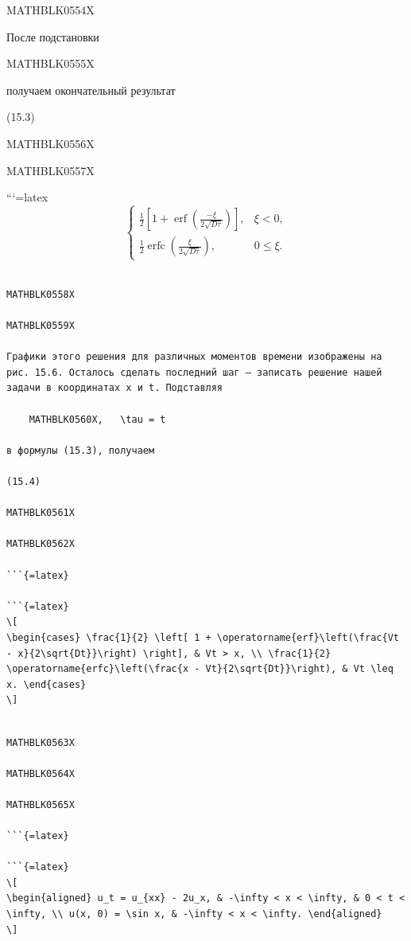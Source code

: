\documentclass[
]{article}
\begin{document}
MATHBLK0554X

После подстановки

MATHBLK0555X

получаем окончательный результат

(15.3)

MATHBLK0556X

MATHBLK0557X

```{=latex}
\[
\begin{cases} \frac{1}{2} \left[ 1 + \operatorname{erf} \left( \frac{-\xi}{2\sqrt{D\tau}} \right) \right], & \xi < 0, \\ \frac{1}{2} \operatorname{erfc} \left( \frac{\xi}{2\sqrt{D\tau}} \right), & 0 \leq \xi. \end{cases}
\]

\begin{verbatim}

MATHBLK0558X

MATHBLK0559X

Графики этого решения для различных моментов времени изображены на рис. 15.6. Осталось сделать последний шаг — записать решение нашей задачи в координатах x и t. Подставляя

    MATHBLK0560X,   \tau = t

в формулы (15.3), получаем

(15.4)

MATHBLK0561X

MATHBLK0562X

```{=latex}

```{=latex}
\[
\begin{cases} \frac{1}{2} \left[ 1 + \operatorname{erf}\left(\frac{Vt - x}{2\sqrt{Dt}}\right) \right], & Vt > x, \\ \frac{1}{2} \operatorname{erfc}\left(\frac{x - Vt}{2\sqrt{Dt}}\right), & Vt \leq x. \end{cases}
\]
\end{verbatim}

\begin{verbatim}

MATHBLK0563X

MATHBLK0564X

MATHBLK0565X

```{=latex}

```{=latex}
\[
\begin{aligned} u_t = u_{xx} - 2u_x, & -\infty < x < \infty, & 0 < t < \infty, \\ u(x, 0) = \sin x, & -\infty < x < \infty. \end{aligned}
\]
\end{verbatim}
\end{document}
